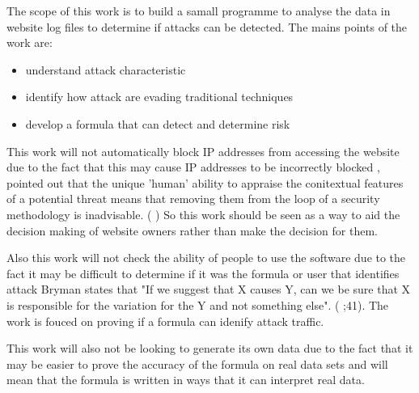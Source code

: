The scope of this work is to build a samall programme to analyse the data in website log files to determine if attacks can be detected. The mains points of the work are:
\begin{itemize}
    \item understand attack characteristic
    \item identify how attack are evading traditional techniques 
    \item develop a formula that can detect and determine risk
\end{itemize}

This work will not automatically block IP addresses from accessing the website due to the fact that this may cause IP addresses to be incorrectly blocked \citeauthor{TargetedCyberSecurity}, pointed out that the unique 'human' ability to appraise the conitextual features of a potential threat means that removing them from the loop of a security methodology is inadvisable. (\cite{TargetedCyberSecurity} ) So this work should be seen as a way to aid the decision making of website owners rather than make the decision for them. 

Also this work will not check the ability of people to use the software due to the fact it may be difficult to determine if it was the formula or user that identifies attack Bryman states that "If we suggest that X causes Y, can we be sure that X is responsible for the variation for the Y and not something else". (\citeauthor{bryman_2016} \citeyear{bryman_2016};41). The work is fouced on proving if a formula can idenify attack traffic.


This work will also not be looking to generate its own data due to the fact that it may be easier to prove the accuracy of the formula on real data sets and will mean that the formula is written in ways that it can interpret real data.